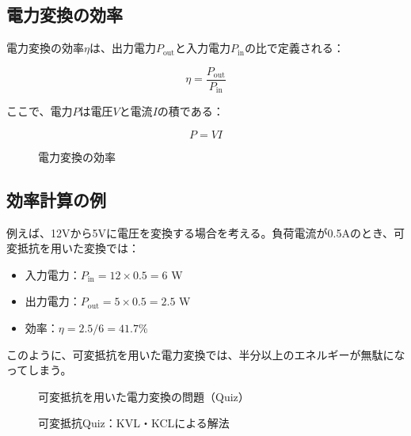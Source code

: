 \subsection{電力変換の効率}

電力変換の効率$\eta$は、出力電力$P_{\text{out}}$と入力電力$P_{\text{in}}$の比で定義される：

\begin{equation}
\eta = \frac{P_{\text{out}}}{P_{\text{in}}}
\end{equation}

ここで、電力$P$は電圧$V$と電流$I$の積である：

\begin{equation}
P = VI
\end{equation}

\begin{figure}[H]
\centering
{}
\caption{電力変換の効率}
\label{fig:efficiency}
\end{figure}

\subsection{効率計算の例}

例えば、12Vから5Vに電圧を変換する場合を考える。負荷電流が0.5Aのとき、可変抵抗を用いた変換では：

\begin{itemize}
\item 入力電力：$P_{\text{in}} = 12 \times 0.5 = 6$ W
\item 出力電力：$P_{\text{out}} = 5 \times 0.5 = 2.5$ W
\item 効率：$\eta = 2.5/6 = 41.7$\%
\end{itemize}

このように、可変抵抗を用いた電力変換では、半分以上のエネルギーが無駄になってしまう。

\begin{figure}[H]
\centering
{}
\caption{可変抵抗を用いた電力変換の問題（Quiz）}
\label{fig:resistor_quiz}
\end{figure}

\begin{figure}[H]
\centering
{}
\caption{可変抵抗Quiz：KVL・KCLによる解法}
\label{fig:resistor_quiz_solution}
\end{figure}

